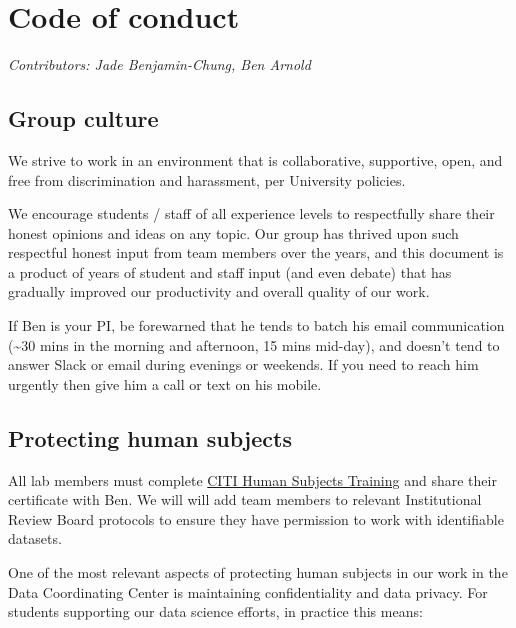 \documentclass[
]{book}
\begin{document}
\hypertarget{code-of-conduct}{%
\chapter{Code of conduct}\label{code-of-conduct}}

\emph{Contributors: Jade Benjamin-Chung, Ben Arnold}

\hypertarget{group-culture}{%
\section{Group culture}\label{group-culture}}

We strive to work in an environment that is collaborative, supportive, open, and free from discrimination and harassment, per University policies.

We encourage students / staff of all experience levels to respectfully share their honest opinions and ideas on any topic. Our group has thrived upon such respectful honest input from team members over the years, and this document is a product of years of student and staff input (and even debate) that has gradually improved our productivity and overall quality of our work.

If Ben is your PI, be forewarned that he tends to batch his email communication (\textasciitilde30 mins in the morning and afternoon, 15 mins mid-day), and doesn't tend to answer Slack or email during evenings or weekends. If you need to reach him urgently then give him a call or text on his mobile.

\hypertarget{protecting-human-subjects}{%
\section{Protecting human subjects}\label{protecting-human-subjects}}

All lab members must complete \href{https://irb.ucsf.edu/citi-human-subjects-training}{CITI Human Subjects Training} and share their certificate with Ben. We will will add team members to relevant Institutional Review Board protocols to ensure they have permission to work with identifiable datasets.

One of the most relevant aspects of protecting human subjects in our work in the Data Coordinating Center is maintaining confidentiality and data privacy. For students supporting our data science efforts, in practice this means:
\end{document}
